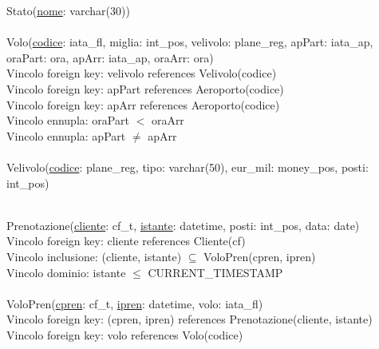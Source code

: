 \documentclass[a4paper,12pt]{report}
\begin{document}
      \hspace*{-0.75cm}
      Stato(\underline{nome}: varchar(30)) \\ \\

      \hspace*{-0.75cm}
      Volo(\underline{codice}: iata\_fl, miglia: int\_pos, velivolo: plane\_reg, apPart: iata\_ap, oraPart: ora, apArr: iata\_ap, oraArr: ora) \\
      \hspace*{1cm} Vincolo foreign key: velivolo references Velivolo(codice) \\
      \hspace*{1cm} Vincolo foreign key: apPart references Aeroporto(codice) \\
      \hspace*{1cm} Vincolo foreign key: apArr references Aeroporto(codice) \\
      \hspace*{1cm} Vincolo ennupla: oraPart $<$ oraArr \\
      \hspace*{1cm} Vincolo ennupla: apPart $\neq$ apArr \\ \\

      \hspace*{-0.75cm}
      Velivolo(\underline{codice}: plane\_reg, tipo: varchar(50), eur\_mil: money\_pos, posti: int\_pos) \\ \\

      \newpage

      \hspace*{-0.75cm}
      Prenotazione(\underline{cliente}: cf\_t, \underline{istante}: datetime, posti: int\_pos, data: date) \\
      \hspace*{1cm} Vincolo foreign key: cliente references Cliente(cf) \\
      \hspace*{1cm} Vincolo inclusione: (cliente, istante) $\subseteq$ VoloPren(cpren, ipren) \\
      \hspace*{1cm} Vincolo dominio: istante $\leq$ CURRENT\_TIMESTAMP \\ \\

      \hspace*{-0.75cm}
      VoloPren(\underline{cpren}: cf\_t, \underline{ipren}: datetime, volo: iata\_fl) \\
      \hspace*{1cm} Vincolo foreign key: (cpren, ipren) references Prenotazione(cliente, istante) \\
      \hspace*{1cm} Vincolo foreign key: volo references Volo(codice) \\ \\
\end{document}
